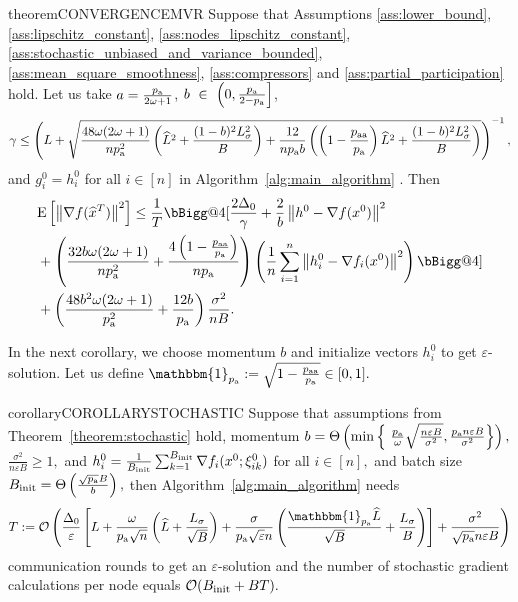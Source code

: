 \documentclass{article}
\makeatletter
\newcommand{\algorithmname}{DARIA}
\newcommand*{\probavailable}{\ensuremath{p_{\textnormal{a}}}}
\newcommand*{\probpairaa}{\ensuremath{p_{\textnormal{aa}}}}
\newcommand{\vast}{\bBigg@{4}}
\makeatother
\begin{document}
\begin{restatable}{theorem}{CONVERGENCEMVR}
  \label{theorem:stochastic}
  Suppose that Assumptions \ref{ass:lower_bound}, \ref{ass:lipschitz_constant}, \ref{ass:nodes_lipschitz_constant}, \ref{ass:stochastic_unbiased_and_variance_bounded}, \ref{ass:mean_square_smoothness}, \ref{ass:compressors} and \ref{ass:partial_participation} hold. Let us take $a = \frac{\probavailable}{2\omega + 1}$, $b~\in~\left(0, \frac{\probavailable}{2 - \probavailable}\right]$, 
  $$\gamma \leq \left(L + \sqrt{\frac{48 \omega (2 \omega + 1)}{n \probavailable^2} \left(\widehat{L}^2 + \frac{(1 - b)^2 L_{\sigma}^2}{B}\right) + \frac{12}{n \probavailable b}\left(\left(1 - \frac{\probpairaa}{\probavailable}\right) \widehat{L}^2 + \frac{(1 - b)^2 L_{\sigma}^2}{B}\right)}\right)^{-1},$$
  and $g^{0}_i = h^{0}_i$ for all $i \in [n]$
  in Algorithm~\ref{alg:main_algorithm} \algname{(\algorithmname-MVR)}.
  Then 
\begin{align*}
  &\Exp{\norm{\nabla f(\widehat{x}^T)}^2} \leq \frac{1}{T}\vast[\frac{2 \Delta_0}{\gamma} + \frac{2}{b} \norm{h^{0} - \nabla f(x^{0})}^2 \\
  &+ \left(\frac{32 b \omega (2 \omega + 1)}{n \probavailable^2} + \frac{4 \left(1 - \frac{\probpairaa}{\probavailable}\right)}{n \probavailable}\right)\left(\frac{1}{n}\sum_{i=1}^n\norm{h^{0}_i - \nabla f_i(x^{0})}^2\right)\vast] \\
  &+ \left(\frac{48 b^2 \omega (2 \omega + 1)}{\probavailable^2} + \frac{12 b}{\probavailable}\right) \frac{\sigma^2}{n B}.
\end{align*}
\end{restatable}

In the next corollary, we choose momentum $b$ and initialize vectors $h^{0}_i$ to get $\varepsilon$-solution. Let us define $\mathbbm{1}_{\probavailable} \eqdef \sqrt{1 - \frac{\probpairaa}{\probavailable}} \in [0, 1].$

\begin{restatable}{corollary}{COROLLARYSTOCHASTIC}
  \label{cor:stochastic}
  Suppose that assumptions from Theorem~\ref{theorem:stochastic} hold, momentum $b = \Theta\left(\min \left\{\ \frac{\probavailable}{\omega}\sqrt{\frac{n \varepsilon B}{\sigma^2}}, \frac{\probavailable n \varepsilon B}{\sigma^2}\right\}\right),$ $\frac{\sigma^2}{n \varepsilon B} \geq 1,$
  and $h^{0}_i = \frac{1}{B_{\textnormal{init}}} \sum_{k = 1}^{B_{\textnormal{init}}} \nabla f_i(x^0; \xi^0_{ik})$ for all $i \in [n],$ and batch size $B_{\textnormal{init}} = \Theta\left(\frac{\sqrt{\probavailable} B}{b}\right),$ then Algorithm~\ref{alg:main_algorithm} \algname{(\algorithmname-MVR)} needs
  $$T \eqdef \cO\left(\frac{\Delta_0}{\varepsilon}\left[L + \frac{\omega}{\probavailable\sqrt{n}}\left(\widehat{L} + \frac{L_{\sigma}}{\sqrt{B}}\right) + \frac{\sigma}{\probavailable \sqrt{\varepsilon} n}\left(\frac{\mathbbm{1}_{\probavailable}\widehat{L}}{\sqrt{B}} + \frac{L_\sigma}{B}\right)\right] + \frac{\sigma^2}{\sqrt{\probavailable} n \varepsilon B}\right)$$
  communication rounds to get an $\varepsilon$-solution and the number of stochastic gradient calculations per node equals $\mathcal{O}(B_{\textnormal{init}} + BT).$
\end{restatable}
\end{document}
